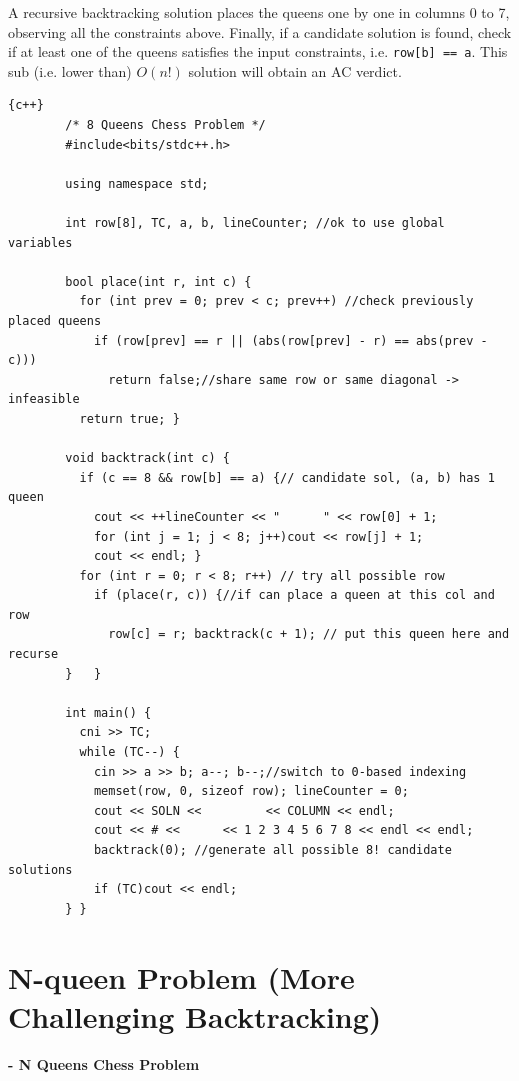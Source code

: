 \hspace{7mm}A recursive backtracking solution places the queens one by one in columns 0 to 7, observing all the constraints above. Finally, if a candidate solution is found, check if at least one of the queens satisfies the input constraints, i.e. \lstinline|row[b] == a|. This sub (i.e. lower than) $O(n!)$ solution will obtain an AC verdict.

\begin{lstlisting}{c++}
        /* 8 Queens Chess Problem */
        #include<bits/stdc++.h>
        
        using namespace std;
        
        int row[8], TC, a, b, lineCounter; //ok to use global variables
        
        bool place(int r, int c) {
          for (int prev = 0; prev < c; prev++) //check previously placed queens
            if (row[prev] == r || (abs(row[prev] - r) == abs(prev - c)))
              return false;//share same row or same diagonal -> infeasible
          return true; }
        
        void backtrack(int c) {
          if (c == 8 && row[b] == a) {// candidate sol, (a, b) has 1 queen
            cout << ++lineCounter << "      " << row[0] + 1;
            for (int j = 1; j < 8; j++)cout << row[j] + 1;
            cout << endl; }
          for (int r = 0; r < 8; r++) // try all possible row
            if (place(r, c)) {//if can place a queen at this col and row
              row[c] = r; backtrack(c + 1); // put this queen here and recurse
        }   }
        
        int main() {
          cni >> TC;
          while (TC--) {
            cin >> a >> b; a--; b--;//switch to 0-based indexing
            memset(row, 0, sizeof row); lineCounter = 0;
            cout << SOLN <<         << COLUMN << endl;
            cout << # <<      << 1 2 3 4 5 6 7 8 << endl << endl;
            backtrack(0); //generate all possible 8! candidate solutions
            if (TC)cout << endl;
        } }   

\end{lstlisting}

\clearpage


\section{N-queen Problem (More Challenging Backtracking)}
\label{n-Queen}

\href{https://vj.z180.cn/7e4e8d92abc27cb470b49794bd31bb31?v=1575831964}{}\textbf{ - N Queens Chess Problem}


